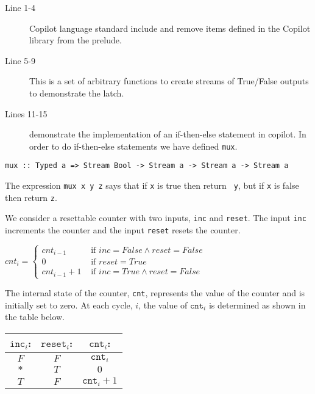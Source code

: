 \begin{description}
  \item[Line 1-4] Copilot language standard include and remove 
  items defined in the Copilot library from the prelude.
  \item[Line 5-9] This is a set of arbitrary functions to create streams of
  True/False outputs to demonstrate the latch.
  \item[Lines 11-15] demonstrate the implementation of an if-then-else statement in copilot. In order to do if-then-else statements we have defined {\tt mux}.
\end{description}

%
\begin{lstlisting}[language = Copilot, frame = single]
mux :: Typed a => Stream Bool -> Stream a -> Stream a -> Stream a
\end{lstlisting}
%

The expression {\tt mux x y z} says that if {\tt x} is true then return {\tt
y}, but if {\tt x} is false then return {\tt z}.

\begin{example} We consider a resettable counter with two inputs, {\tt inc} and
{\tt reset}.
%
The input {\tt inc} increments the counter and the input {\tt reset} resets the
counter.
%
\begin{center}
${cnt}_{i}=\begin{cases}
{cnt}_{i-1} & \text{ if } {inc} = False \wedge {reset} = False \\
0 & \text{ if } {reset} = True\\
{cnt}_{i-1} + 1 & \text { if } {inc} = True \wedge {reset} = False
\end{cases}$
\end{center} 
%
The internal state of the counter, {\tt cnt}, represents the value of the
counter and is initially set to zero. 
%
At each cycle, $i$, the value of $\mathtt{cnt}_i$ is determined as shown in the
table below.

\begin{center}
\begin{minipage}{0.25\linewidth}
\begin{tabular}{c|c||c}
$\mathtt{inc}_i$: & $\mathtt{reset}_i$: & $\mathtt{cnt}_i$:\\
\hline
$F$ & $F$ & $\mathtt{cnt}_{i}$ \\
\hline
$*$ & $T$ & $0$ \\
\hline
$T$ & $F$ & $\mathtt{cnt}_{i}+1$\\
\hline
\end{tabular}
\end{minipage}
\end{center}
\end{example}

